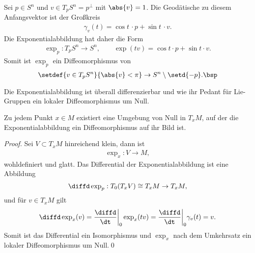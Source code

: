 \documentclass[%
	paper=a5,%
	fleqn,%
	DIV=18,%
	BCOR=0mm,
	fontsize=11pt,
	titlepage=false,%
	bibliography=totoc,
	DIV=18,%
	twoside=true,
	pdftitle=Riemannsche Geometrie,
	pdfauthor=Uwe Semmelmann,
	numbers=noendperiod]%
	{scrbook}
\begin{document}
\begin{ex}
Sei $p\in S^n$ und $v\in T_pS^n = p^\bot$ mit $\abs{v} = 1$. Die Geodätische zu diesem
Anfangsvektor ist der Großkreis
\begin{align*}
\gamma_v(t) = \cos t\,\cdot p+ \sin t\, \cdot v. 
\end{align*}
Die Exponentialabbildung hat daher die Form
\begin{align*}
\exp_p : T_pS^n \to S^n,\qquad \exp(tv) = \cos t\cdot p + \sin t\cdot v.
\end{align*}
Somit ist $\exp_p$ ein Diffeomorphismus von
\begin{align*}
\setdef{v\in T_pS^n}{\abs{v}< \pi} \to S^n\setminus\setd{-p}.\bsp
\end{align*}
\end{ex}

Die Exponentialabbildung ist überall differenzierbar und wie ihr Pedant für Lie-Gruppen ein lokaler Diffeomorphismus um Null.


\begin{prop}
Zu jedem Punkt $x\in M$ existiert eine Umgebung von Null in $T_xM$, auf
der die Exponentialabbildung ein Diffeomorphismus auf ihr Bild ist.\fish
\end{prop}
\begin{proof}
Sei $V\subset T_xM$ hinreichend klein, dann ist
\begin{align*}
\exp_x : V\to M,
\end{align*}
wohldefiniert und glatt. Das Differential der Exponentialabbildung ist eine
Abbildung
\begin{align*}
\diffd \exp_p: T_0(T_xV)\cong T_xM \to T_xM,
\end{align*}
und für $v\in T_xM$ gilt
\begin{align*}
\diffd \exp_x(v) = \frac{\diffd}{\dt}\bigg|_0 \exp_x(tv)
= \frac{\diffd}{\dt}\bigg|_0 \gamma_v(t)
= v.
\end{align*}
Somit ist das Differential ein Isomorphismus und $\exp_x$ nach dem Umkehrsatz
ein lokaler Diffeomorphismus um Null.\qed
\end{proof}
\end{document}
